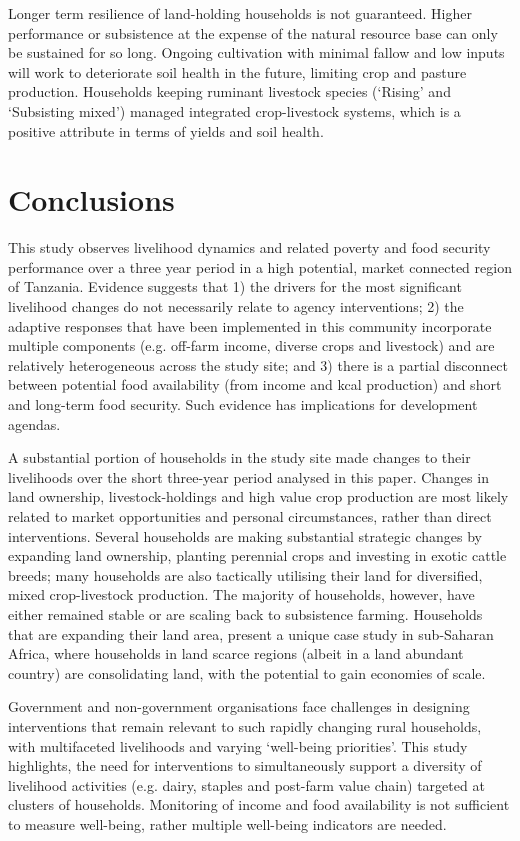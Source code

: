 Longer term resilience of land-holding households is not guaranteed. Higher performance or subsistence at the expense of the natural resource base can only be sustained for so long. Ongoing cultivation with minimal fallow and low inputs will work to deteriorate soil health in the future, limiting crop and pasture production. Households keeping ruminant livestock species (`Rising' and `Subsisting mixed') managed integrated crop-livestock systems, which is a positive attribute in terms of yields and soil health.

\section{Conclusions}

This study observes livelihood dynamics and related poverty and food security performance over a three year period in a high potential, market connected region of Tanzania. Evidence suggests that 1) the drivers for the most significant livelihood changes do not necessarily relate to agency interventions; 2) the adaptive responses that have been implemented in this community incorporate multiple components (e.g. off-farm income, diverse crops and livestock) and are relatively heterogeneous across the study site; and 3) there is a partial disconnect between potential food availability (from income and kcal production) and short and long-term food security. Such evidence has implications for development agendas.

A substantial portion of households in the study site made changes to their livelihoods over the short three-year period analysed in this paper. Changes in land ownership, livestock-holdings and high value crop production are most likely related to market opportunities and personal circumstances, rather than direct interventions. Several households are making substantial strategic changes by expanding land ownership, planting perennial crops and investing in exotic cattle breeds; many households are also tactically utilising their land for diversified, mixed crop-livestock production. The majority of households, however, have either remained stable or are scaling back to subsistence farming. Households that are expanding their land area, present a unique case study in sub-Saharan Africa, where households in land scarce regions (albeit in a land abundant country) are consolidating land, with the potential to gain economies of scale.

Government and non-government organisations face challenges in designing interventions that remain relevant to such rapidly changing rural households, with multifaceted livelihoods and varying `well-being priorities'. This study highlights, the need for interventions to simultaneously support a diversity of livelihood activities (e.g. dairy, staples and post-farm value chain) targeted at clusters of households. Monitoring of income and food availability is not sufficient to measure well-being, rather multiple well-being indicators are needed.

